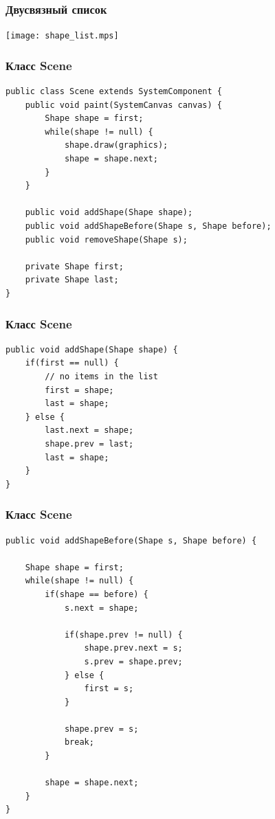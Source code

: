 \documentclass[handout]{beamer}
\begin{document}
\begin{frame}[fragile]
\frametitle{Двусвязный список}
\begin{center}
\texttt{[image: shape\_list.mps]}
\end{center}
\end{frame}


\begin{frame}[fragile]
\frametitle{Класс Scene}
\begin{lstlisting}
public class Scene extends SystemComponent {
    public void paint(SystemCanvas canvas) {
        Shape shape = first;
        while(shape != null) {
            shape.draw(graphics);
            shape = shape.next;
        }
    }

    public void addShape(Shape shape);
    public void addShapeBefore(Shape s, Shape before);
    public void removeShape(Shape s);

    private Shape first;
    private Shape last;
}
\end{lstlisting}
\end{frame}


\begin{frame}[fragile]
\frametitle{Класс Scene}
\begin{lstlisting}
public void addShape(Shape shape) {
    if(first == null) {
        // no items in the list
        first = shape;
        last = shape;
    } else {
        last.next = shape;
        shape.prev = last;
        last = shape;
    }
}
\end{lstlisting}
\end{frame}


\begin{frame}[fragile]
\frametitle{Класс Scene}
\begin{lstlisting}
public void addShapeBefore(Shape s, Shape before) {

    Shape shape = first;
    while(shape != null) {
        if(shape == before) {
            s.next = shape;

            if(shape.prev != null) {
                shape.prev.next = s;
                s.prev = shape.prev;
            } else {
                first = s;
            }

            shape.prev = s;
            break;
        }

        shape = shape.next;
    }
}
\end{lstlisting}
\end{frame}
\end{document}

